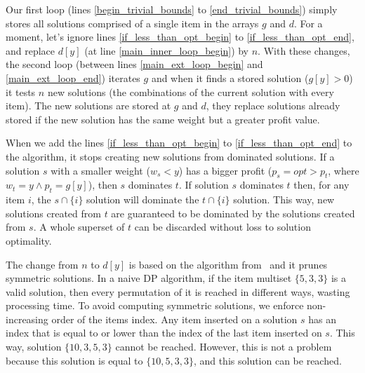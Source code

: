 \documentclass[runningheads,a4paper]{llncs}
\begin{document}
Our first loop (lines \ref{begin_trivial_bounds} to \ref{end_trivial_bounds}) simply stores all solutions comprised of a single item in the arrays \(g\) and \(d\). 
For a moment, let's ignore lines \ref{if_less_than_opt_begin} to \ref{if_less_than_opt_end}, and replace \(d[y]\) (at line \ref{main_inner_loop_begin}) by \(n\). 
With these changes, the second loop (between lines \ref{main_ext_loop_begin} and \ref{main_ext_loop_end}) 
iterates \(g\) and when it finds a stored solution (\(g[y] > 0\)) it tests \(n\) new solutions 
(the combinations of the current solution with every item). 
The new solutions are stored at \(g\) and \(d\), they replace solutions already stored if the new solution has the same weight but a greater profit value.

When we add the lines \ref{if_less_than_opt_begin} to \ref{if_less_than_opt_end} to the algorithm, it stops creating new solutions from dominated solutions. 
If a solution \(s\) with a smaller weight (\(w_s < y\)) has a bigger profit (\(p_s = opt > p_t\), where \(w_t = y \land p_t = g[y]\)), then \(s\) dominates \(t\). 
If solution \(s\) dominates \(t\) then, for any item \(i\), the \(s \cap \{i\}\) solution will dominate the \(t \cap \{i\}\) solution. 
This way, new solutions created from \(t\) are guaranteed to be dominated by the solutions created from \(s\). 
A whole superset of \(t\) can be discarded without loss to solution optimality. 

The change from \(n\) to \(d[y]\) is based on the algorithm from~\cite{gar72} and it prunes symmetric solutions.
In a naive DP algorithm, if the item multiset \(\{5, 3, 3\}\) is a valid solution, then every permutation of it is reached in different ways, wasting processing time. 
To avoid computing symmetric solutions, we enforce non-increasing order of the items index. 
Any item inserted on a solution \(s\) has an index that is equal to or lower than the index of the last item inserted on \(s\). 
This way, solution \(\{10,3,5,3\}\) cannot be reached.
However, this is not a problem because this solution is equal to \(\{10, 5, 3, 3\}\), and this solution can be reached. 
\end{document}

